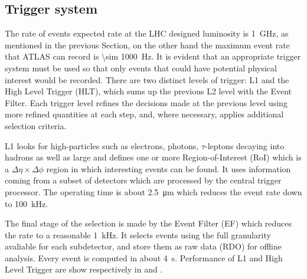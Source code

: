 \subsection{Trigger system}
The rate of events expected rate at the LHC designed luminosity is \SI{1}{\GHz}, as mentioned in the previous Section, on the other hand the maximum event rate that ATLAS can record is \SI{\sim 1000}{\Hz}. It is evident that an appropriate trigger system must be used so that only events that could have potential physical interest would be recorded. There are two distinct levels of trigger: L1 and the High Level Trigger (HLT), which sums up the previous L2 level with the Event Filter. Each trigger level refines the decisions made at the previous level using more refined quantities at each step, and, where necessary, applies additional selection criteria.

L1 looks for high-\pt particles such as electrons, photons, $\tau$-leptons decaying into hadrons as well as large \met and defines one or more Region-of-Interest (RoI) which is a $\Delta \eta \times \Delta \phi$ region in which interesting events can be found. It uses information coming from a subset of detectors which are processed by the central trigger processor. The operating time is about \SI{2.5}{\um} which reduces the event rate down to \SI{100}{\kHz}.

The final stage of the selection is made by the Event Filter (EF) which reduces the rate to a reasonable \SI{1}{\kHz}. It selects events using the full granularity avaliable for each subdetector, and store them as raw data (RDO) for offline analysis. Every event is computed in about \SI{4}{\s}. Performance of L1 and High Level Trigger are show respectively in \Fig{\ref{fig:L1}} and \Fig{\ref{fig:HLT}}.

